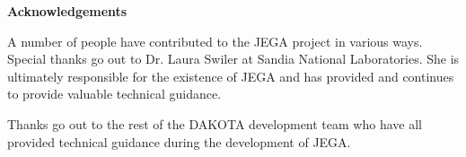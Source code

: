 \begin{center}
{\Large \bf Acknowledgements}
\end{center}

A number of people have contributed to the JEGA project in various
ways.  Special thanks go out to Dr. Laura Swiler at Sandia National
Laboratories.  She is ultimately responsible for the existence of
JEGA and has provided and continues to provide valuable technical
guidance.

Thanks go out to the rest of the DAKOTA development team
who have all provided technical guidance during the development of
JEGA.
